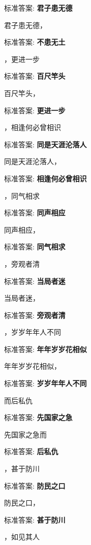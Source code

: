 \documentclass[12pt, a4paper, addpoints]{exam}
\begin{document}
\begin{multicols}{2}
\begin{questions}
标准答案: \textbf{君子患无德}

\question[1] 君子患无德，\uline{\qquad\qquad\qquad}

标准答案: \textbf{不患无土}

\question[1] \uline{\qquad\qquad\qquad}，更进一步

标准答案: \textbf{百尺竿头}

\question[1] 百尺竿头，\uline{\qquad\qquad\qquad}

标准答案: \textbf{更进一步}

\question[1] \uline{\qquad\qquad\qquad}，相逢何必曾相识

标准答案: \textbf{同是天涯沦落人}

\question[1] 同是天涯沦落人，\uline{\qquad\qquad\qquad}

标准答案: \textbf{相逢何必曾相识}

\question[1] \uline{\qquad\qquad\qquad}，同气相求

标准答案: \textbf{同声相应}

\question[1] 同声相应，\uline{\qquad\qquad\qquad}

标准答案: \textbf{同气相求}

\question[1] \uline{\qquad\qquad\qquad}，旁观者清

标准答案: \textbf{当局者迷}

\question[1] 当局者迷，\uline{\qquad\qquad\qquad}

标准答案: \textbf{旁观者清}

\question[1] \uline{\qquad\qquad\qquad}，岁岁年年人不同

标准答案: \textbf{年年岁岁花相似}

\question[1] 年年岁岁花相似，\uline{\qquad\qquad\qquad}

标准答案: \textbf{岁岁年年人不同}

\question[1] \uline{\qquad\qquad\qquad}而后私仇

标准答案: \textbf{先国家之急}

\question[1] 先国家之急而\uline{\qquad\qquad\qquad}

标准答案: \textbf{后私仇}

\question[1] \uline{\qquad\qquad\qquad}，甚于防川

标准答案: \textbf{防民之口}

\question[1] 防民之口，\uline{\qquad\qquad\qquad}

标准答案: \textbf{甚于防川}

\question[1] \uline{\qquad\qquad\qquad}，如见其人


\end{questions}
\end{multicols}
\end{document}
